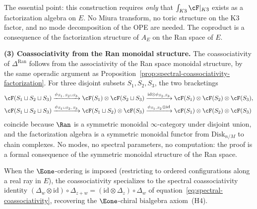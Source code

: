 The essential point: this construction requires \emph{only} that
$\int_{K3} \cF|_{K3}$ exists as a factorization algebra on $E$.
No Miura transform, no toric structure on the K3 factor, and no mode
decomposition of the OPE are needed. The coproduct is a consequence
of the factorization structure of $A_E$ on the Ran space of $E$.

\medskip
\noindent\textbf{(3) Coassociativity from the Ran monoidal structure.}
The coassociativity of $\Delta^{\mathrm{Ran}}$ follows from the
associativity of the Ran space monoidal structure, by the same
operadic argument as
Proposition~\ref{prop:spectral-coassociativity-factorization}.
For three disjoint subsets $S_1, S_2, S_3$, the two bracketings
\begin{align*}
 &\cF(S_1 \sqcup S_2 \sqcup S_3)
 \xrightarrow{\phi_{S_1,\, S_2 \sqcup S_3}}
 \cF(S_1) \otimes \cF(S_2 \sqcup S_3)
 \xrightarrow{\mathrm{id} \otimes \phi_{S_2, S_3}}
 \cF(S_1) \otimes \cF(S_2) \otimes \cF(S_3), \\
 &\cF(S_1 \sqcup S_2 \sqcup S_3)
 \xrightarrow{\phi_{S_1 \sqcup S_2,\, S_3}}
 \cF(S_1 \sqcup S_2) \otimes \cF(S_3)
 \xrightarrow{\phi_{S_1, S_2} \otimes \mathrm{id}}
 \cF(S_1) \otimes \cF(S_2) \otimes \cF(S_3)
\end{align*}
coincide because $\Ran$ is a symmetric monoidal $\infty$-category under
disjoint union, and the factorization algebra is a symmetric monoidal
functor from $\mathrm{Disk}_{n/M}$ to chain complexes. No modes, no
spectral parameters, no computation: the proof is a formal consequence
of the symmetric monoidal structure of the Ran space.

When the $\Eone$-ordering is imposed (restricting to ordered
configurations along a real ray in $E$), the coassociativity
specializes to the spectral coassociativity identity
$(\Delta_w \otimes \mathrm{id}) \circ \Delta_{z+w}
= (\mathrm{id} \otimes \Delta_z) \circ \Delta_w$ of
equation~\eqref{eq:spectral-coassociativity}, recovering the
$\Eone$-chiral bialgebra axiom~(H4).

